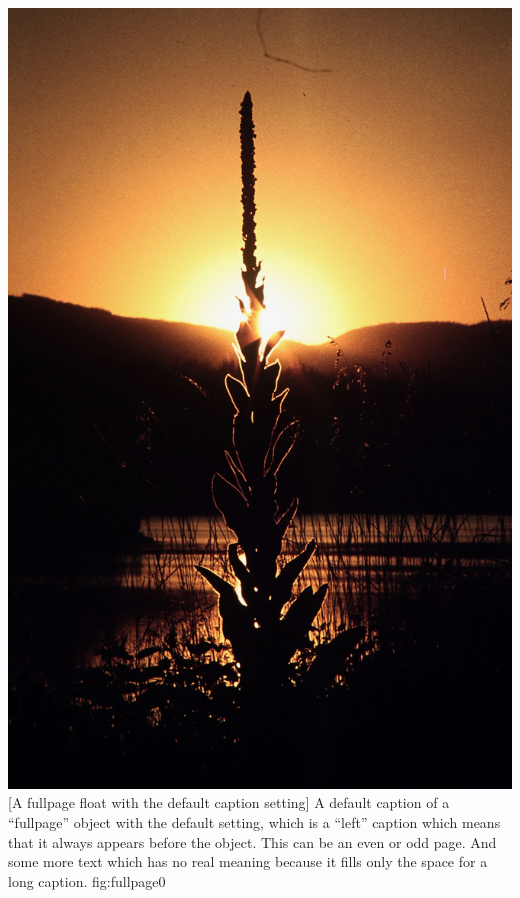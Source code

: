 \documentclass[twoside,twocolumn]{scrartcl}
\begin{document}
\Float[capPos=right]
%
  {\includegraphics[fullpage]{usa5}}%
  [A fullpage float with the default caption setting]%
  {A default caption of a ``fullpage'' object with the default setting, which
   is a ``left''  caption which means that it always appears before the object.
   This can be an even or odd page. And some more text which has no
   real meaning because it fills only the space for a long caption.}%
  {fig:fullpage0}

\blinddocument
\end{document}
